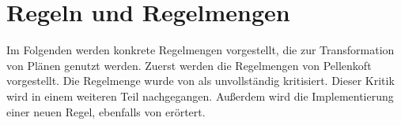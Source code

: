 \chapter{Regeln und Regelmengen}

Im Folgenden werden konkrete Regelmengen vorgestellt, die zur Transformation von Plänen genutzt werden. Zuerst werden die Regelmengen von Pellenkoft vorgestellt. Die Regelmenge wurde von \cite{shanbhag2014optimizing} als unvollständig kritisiert. Dieser Kritik wird in einem weiteren Teil nachgegangen. Außerdem wird die Implementierung einer neuen Regel, ebenfalls von \cite{shanbhag2014optimizing} erörtert. 










%